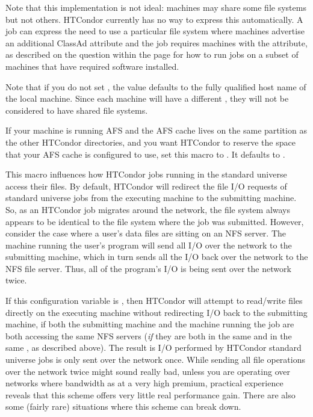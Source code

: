\begin{description}
  Note that this implementation is not ideal: machines may share some
  file systems but not others. HTCondor currently has no way to express
  this automatically. 
  A job can express the need to use a particular file system where
  machines advertise an additional ClassAd attribute
  and the job requires machines with the attribute, 
  as described on the question within the
  page for how to run jobs on a subset of machines that have required
  software installed.

  Note that if you do not set 
  , the value defaults
  to the fully qualified host name of the local machine.
  Since each machine will have a different
  ,
  they will not be considered to have shared file systems.
  
\label{param:ReserveAfsCache}
\item[\Macro{RESERVE\_AFS\_CACHE}]
  If your machine is running AFS and the AFS cache lives on the same
  partition as the other HTCondor directories, and you want HTCondor to
  reserve the space that your AFS cache is configured to use, set this
  macro to .  It defaults to .
  
\label{param:UseNfs}
\item[\Macro{USE\_NFS}]
  This macro influences
  how HTCondor jobs running in the standard universe access their
  files.  By default, HTCondor will redirect the file I/O requests
  of standard universe jobs from the executing machine to the submitting
  machine.  So, as an HTCondor job migrates around
  the network, the file system always appears to be identical to the
  file system where the job was submitted.  However, consider the case
  where a user's data files are sitting on an NFS server. The machine
  running the user's program will send all I/O over the network to the
  submitting machine, which in turn sends all the I/O back
  over the network to the NFS file server. Thus,
  all of the program's I/O is being sent over the network twice.
  
  If this configuration variable is , 
  then HTCondor will attempt to read/write files directly on the 
  executing machine without redirecting I/O back to the submitting
  machine, if both the submitting machine and the machine running the job
  are both accessing the same NFS servers (\emph{if} they are both in the
  same  and in the same ,
  as described above).  The result is I/O performed by HTCondor standard
  universe jobs is only sent over the network once.  
  While sending all file operations over the network twice might sound
  really bad, unless you are operating over networks where bandwidth
  as at a very high premium, practical experience reveals that this
  scheme offers very little real performance gain.  There are also
  some (fairly rare) situations where this scheme can break down.
  

\end{description}
